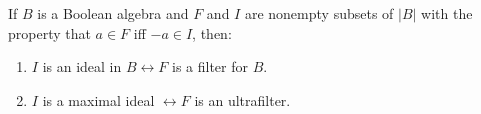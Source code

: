 If $B$ is a Boolean algebra and $F$ and $I$ are nonempty subsets of $|B|$ with the property that $a \in F$ iff $-a \in I$, then:
\begin{enumerate}
\item $I$ is an ideal in $B \leftrightarrow F$ is a filter for $B$.
\item $I$ is a maximal ideal $\leftrightarrow F$ is an ultrafilter.
\end{enumerate}
